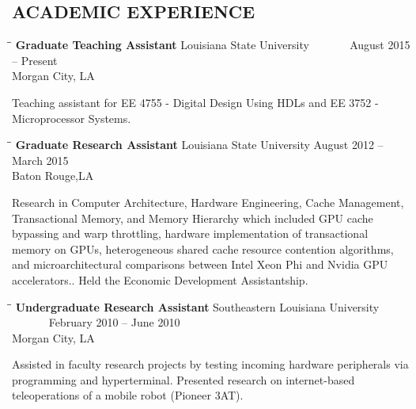 \documentclass{res}
\begin{document}
\begin{resume}
\section{ACADEMIC EXPERIENCE}
	\vspace{-0.1in}	
	\begin{tabbing}
		\hspace{2.3in}\= \hspace{2.6in}\= \kill %
		{\bf Graduate Teaching Assistant} \>Louisiana State University \> ~~~~~~ August 2015 – Present\\
		\>Morgan City, LA
	\end{tabbing}\vspace{-20pt}
	Teaching assistant for EE 4755 - Digital Design Using HDLs and EE 3752 - Microprocessor Systems.
	\begin{tabbing}
		\hspace{2.3in}\= \hspace{2.6in}\= \kill %
		{\bf Graduate Research Assistant} \>Louisiana State University     \>August 2012 – March 2015\\
		\>Baton Rouge,LA
	\end{tabbing}\vspace{-20pt}      %
	Research in Computer Architecture, Hardware Engineering, Cache Management, Transactional Memory, and Memory Hierarchy which included GPU cache bypassing and warp throttling, hardware implementation of transactional memory on GPUs, heterogeneous shared cache resource contention algorithms, and microarchitectural comparisons between Intel Xeon Phi and Nvidia GPU accelerators.. Held the Economic Development Assistantship.
	\begin{tabbing}
		\hspace{2.3in}\= \hspace{2.6in}\= \kill %
		{\bf Undergraduate Research Assistant} \>Southeastern Louisiana University \> ~~~~~~ February 2010 – June 2010\\
		\>Morgan City, LA
	\end{tabbing}\vspace{-20pt}
	Assisted in faculty research projects by testing incoming hardware peripherals via programming and hyperterminal. Presented research on internet-based teleoperations of a mobile robot (Pioneer 3AT).

   
	    
\end{resume}
\end{document}
